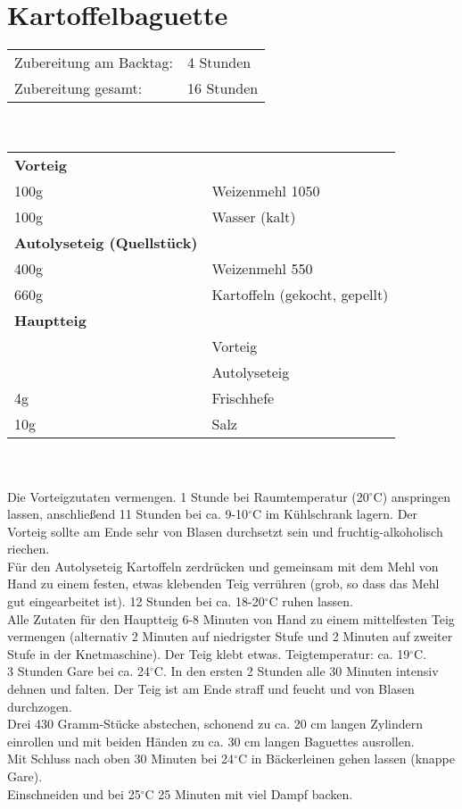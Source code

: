 \section{Kartoffelbaguette}
\begin{tabular}{ll}
    Zubereitung am Backtag: & 4 Stunden  \\
    Zubereitung gesamt:     & 16 Stunden
\end{tabular}\\\paragraph*{}
\begin{tabular}{ll}
    \textbf{Vorteig} \\
    100g & Weizenmehl 1050               \\
    100g & Wasser (kalt)                 \\
    \textbf{Autolyseteig (Quellstück)} \\
    400g & Weizenmehl 550                \\
    660g & Kartoffeln (gekocht, gepellt) \\
    \textbf{Hauptteig} \\
    & Vorteig                       \\
    & Autolyseteig                  \\
    4g   & Frischhefe                    \\
    10g  & Salz                          \\
\end{tabular}\\\paragraph*{}
Die Vorteigzutaten vermengen. 1 Stunde bei Raumtemperatur (20$^\circ$C) anspringen lassen, anschließend 11 Stunden bei ca. 9-10$^\circ$C im Kühlschrank lagern. Der Vorteig sollte am Ende sehr von Blasen durchsetzt sein und fruchtig-alkoholisch riechen.\\
Für den Autolyseteig Kartoffeln zerdrücken und gemeinsam mit dem Mehl von Hand zu einem festen, etwas klebenden Teig verrühren (grob, so dass das Mehl gut eingearbeitet ist). 12 Stunden bei ca. 18-20$^\circ$C ruhen lassen.\\
Alle Zutaten für den Hauptteig 6-8 Minuten von Hand zu einem mittelfesten Teig vermengen (alternativ 2 Minuten auf niedrigster Stufe und 2 Minuten auf zweiter Stufe in der Knetmaschine). Der Teig klebt etwas. Teigtemperatur: ca. 19$^\circ$C.\\
3 Stunden Gare bei ca. 24$^\circ$C. In den ersten 2 Stunden alle 30 Minuten intensiv dehnen und falten. Der Teig ist am Ende straff und feucht und von Blasen durchzogen.\\
Drei 430 Gramm-Stücke abstechen, schonend zu ca. 20 cm langen Zylindern einrollen und mit beiden Händen zu ca. 30 cm langen Baguettes ausrollen.\\
Mit Schluss nach oben 30 Minuten bei 24$^\circ$C in Bäckerleinen gehen lassen (knappe Gare).\\
Einschneiden und bei 25$^\circ$C 25 Minuten mit viel Dampf backen.


